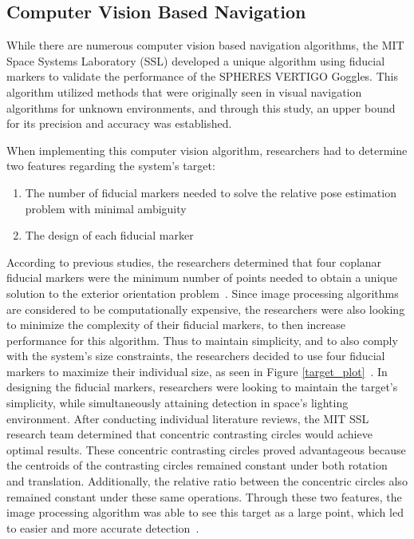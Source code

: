 \documentclass[journal, 10pt]{IEEEtran}
\begin{document}
\subsection{Computer Vision Based Navigation}

While there are numerous computer vision based navigation algorithms, the MIT Space Systems Laboratory (SSL) developed a unique algorithm using fiducial markers to validate the performance of the SPHERES VERTIGO Goggles. This algorithm utilized methods that were originally seen in visual navigation algorithms for unknown environments, and through this study, an upper bound for its precision and accuracy was established.


When implementing this computer vision algorithm, researchers had to determine two features regarding the system's target:
\begin{enumerate}
\item The number of fiducial markers needed to solve the relative pose estimation problem with minimal ambiguity
\item The design of each fiducial marker
\end{enumerate}

According to previous studies, the researchers determined that four coplanar fiducial markers were the minimum number of points needed to obtain a unique solution to the exterior orientation problem~\cite{Thesis}. Since image processing algorithms are considered to be computationally expensive, the researchers were also looking to minimize the complexity of their fiducial markers, to then increase performance for this algorithm. Thus to maintain simplicity, and to also comply with the system's size constraints, the researchers decided to use four fiducial markers to maximize their individual size,  as seen in Figure \ref{target_plot}~\cite{Vision, Thesis}. In designing the fiducial markers, researchers were looking to maintain the target's simplicity, while simultaneously attaining detection in space's lighting environment. After conducting individual literature reviews, the MIT SSL research team determined that concentric contrasting circles would achieve optimal results. These concentric contrasting circles proved advantageous because the centroids of the contrasting circles remained constant under both rotation and translation. Additionally, the relative ratio between the concentric circles also remained constant under these same operations. Through these two features,  the image processing algorithm was able to see this target as a large point, which led to easier and more accurate detection~\cite{Vision, Thesis}.
\end{document}
